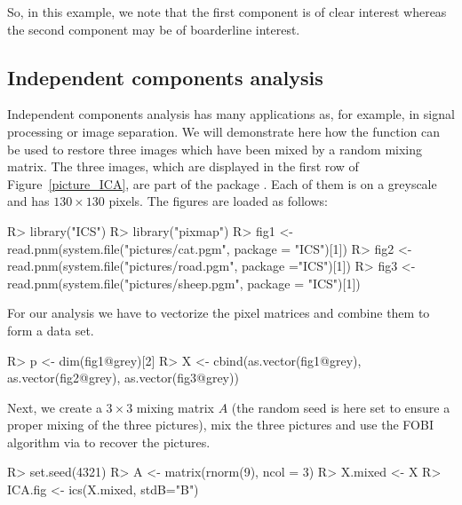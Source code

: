 \documentclass[article,nojss]{jss}
\begin{document}
So, in this example, we note that the first component is of clear interest whereas the second component may be of
boarderline interest.

\subsection{Independent components analysis}\label{EXics}

Independent components analysis has many applications as, for example, in signal processing or image separation. We will
demonstrate here how the function  can be used to restore three images which have been mixed by a random mixing
matrix. The three images, which are displayed in the first row of Figure~\ref{picture_ICA}, are part of the package . Each of
them is on a greyscale and has $130 \times 130$ pixels. The figures are loaded as follows:

\begin{Schunk}
\begin{Sinput}
R> library("ICS")
R> library("pixmap")
R> fig1 <- read.pnm(system.file("pictures/cat.pgm", package = "ICS")[1])
R> fig2 <- read.pnm(system.file("pictures/road.pgm", package ="ICS")[1])
R> fig3 <- read.pnm(system.file("pictures/sheep.pgm", package = "ICS")[1])
\end{Sinput}
\end{Schunk}

For our analysis we have to vectorize the pixel matrices and combine them to form a data set.



\begin{Schunk}
\begin{Sinput}
R> p <- dim(fig1@grey)[2]
R> X <- cbind(as.vector(fig1@grey), as.vector(fig2@grey), as.vector(fig3@grey))
\end{Sinput}
\end{Schunk}

Next, we create a $3 \times 3$ mixing matrix $A$ (the random seed is here set to ensure a proper mixing of the three pictures), mix the
three pictures and use the FOBI algorithm via  to recover the pictures.
\begin{Schunk}
\begin{Sinput}
R> set.seed(4321)
R> A <- matrix(rnorm(9), ncol = 3)
R> X.mixed <- X %
R> ICA.fig <- ics(X.mixed, stdB="B")
\end{Sinput}
\end{Schunk}

\end{document}
